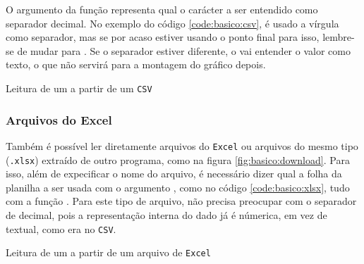     O argumento  da função representa qual o carácter a ser entendido como separador decimal. No exemplo do código \ref{code:basico:csv}, é usado a vírgula como separador, mas se por acaso estiver usando o ponto final para isso, lembre-se de mudar para . Se o separador estiver diferente, o \pandas vai entender o valor como texto, o que não servirá para a montagem do gráfico depois.

    \begin{listing}[H]
        \caption{Leitura de um \dataframe a partir de um \texttt{CSV}}
        \label{code:basico:csv}

    \end{listing}


\subsubsection{Arquivos do Excel}

    Também é possível ler diretamente arquivos do \texttt{Excel} ou arquivos do mesmo tipo (\texttt{.xlsx}) extraído de outro programa, como na figura \ref{fig:basico:download}. Para isso, além de expecificar o nome do arquivo, é necessário dizer qual a folha da planilha a ser usada com o argumento , como no código \ref{code:basico:xlsx}, tudo com a função \href{http://pandas.pydata.org/pandas-docs/stable/reference/api/pandas.read_excel.html#pandas.read_excel}{}. Para este tipo de arquivo, não precisa preocupar com o separador de decimal, pois a representação interna do dado já é númerica, em vez de textual, como era no \texttt{CSV}.

    \begin{listing}[H]
        \caption{Leitura de um \dataframe a partir de um arquivo de \texttt{Excel}}
        \label{code:basico:xlsx}

    \end{listing}
